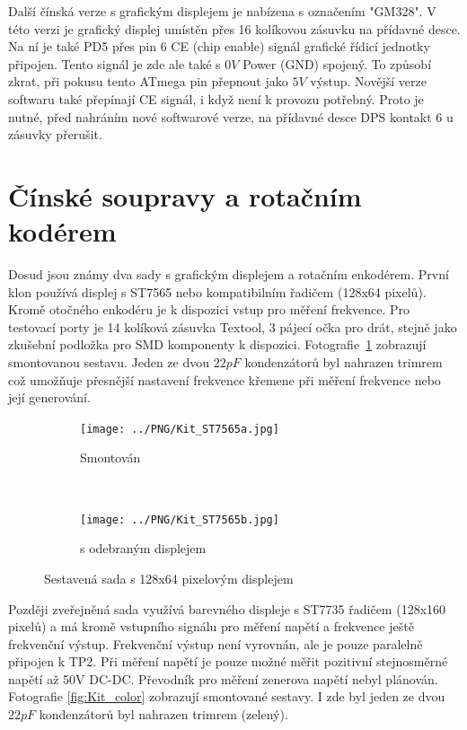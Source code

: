 Další čínská verze s grafickým displejem je nabízena s označením "GM328".
V této verzi je grafický displej umístěn přes 16 kolíkovou zásuvku na přídavné desce. Na ní je také
PD5 přes pin 6 CE (chip enable) signál grafické řídicí jednotky připojen. Tento signál je zde ale
také s \(0V\) Power (GND) spojený. 
To způsobí zkrat, při pokusu tento ATmega pin přepnout jako \(5V\) výstup.
Novější verze softwaru také přepínají CE signál, i když není k provozu potřebný.
Proto je nutné, před nahráním nové softwarové verze, na přídavné desce DPS kontakt 6 u zásuvky
přerušit.

\section{Čínské soupravy a rotačním kodérem}

Dosud jsou známy dva sady s grafickým displejem a rotačním enkodérem.
První klon používá displej s ST7565 nebo kompatibilním řadičem (128x64 pixelů).
Kromě otočného enkodéru je k dispozici vstup pro měření frekvence.
Pro testovací porty je 14 kolíková zásuvka Textool, 3 pájecí očka pro drát, stejně jako zkušební podložka pro SMD komponenty k dispozici. 
Fotografie~\ref{fig:Kit_mono} zobrazují smontovanou sestavu. Jeden ze dvou \(22 pF\) kondenzátorů 
byl nahrazen trimrem což umožňuje přesnější nastavení frekvence křemene při měření frekvence nebo její generování.
\begin{figure}[H]
  \begin{subfigure}[b]{9cm}
    \centering
    \texttt{[image: ../PNG/Kit\_ST7565a.jpg]}
    \caption{Smontován}
  \end{subfigure}
  ~
  \begin{subfigure}[b]{9cm}
    \centering
    \texttt{[image: ../PNG/Kit\_ST7565b.jpg]}
    \caption{s odebraným displejem}
  \end{subfigure}
  \caption{Sestavená sada s 128x64 pixelovým displejem}
  \label{fig:Kit_mono}
\end{figure}

Později zveřejněná sada využívá barevného displeje s ST7735 řadičem (128x160 pixelů) a má kromě
vstupního signálu pro měření napětí a frekvence ještě frekvenční výstup.
Frekvenční výstup není vyrovnán, ale je pouze paralelně připojen k TP2.
Při měření napětí je pouze možné měřit pozitivní stejnosměrné napětí až 50V DC-DC. Převodník pro měření zenerova napětí nebyl plánován. Fotografie \ref{fig:Kit_color} zobrazují smontované sestavy. I zde byl jeden ze dvou \(22 pF\) kondenzátorů byl nahrazen trimrem (zelený). 

